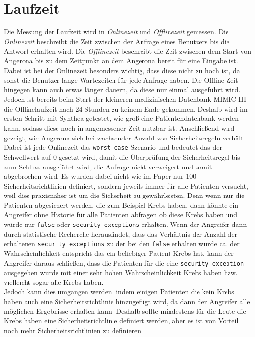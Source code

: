 \documentclass[german,version-2020-11]{uzl-thesis}
\begin{document}
\section{Laufzeit}
Die Messung der Laufzeit wird in \textit{Onlinezeit} und \textit{Offlinezeit} gemessen. Die \textit{Onlinezeit} beschreibt die Zeit zwischen der Anfrage eines Benutzers bis die Antwort erhalten wird. Die \textit{Offlinezeit}  beschreibt die Zeit zwischen dem Start von Angerona bis zu dem Zeitpunkt an dem Angerona bereit für eine Eingabe ist. \\ 
Dabei ist bei der Onlinezeit besonders wichtig, dass diese nicht zu hoch ist, da sonst die Benutzer lange Wartezeiten  für jede Anfrage haben. Die Offline Zeit hingegen kann auch etwas länger dauern, da diese nur einmal ausgeführt wird. \\
Jedoch ist bereits beim Start der kleineren medizinischen Datenbank MIMIC III die Offlinelaufzeit nach 24 Stunden zu keinem Ende gekommen. Deshalb wird im ersten Schritt mit Synthea getestet, wie groß eine Patientendatenbank werden kann, sodass diese noch in angemessener Zeit nutzbar ist.   
Anschließend wird gezeigt, wie Angerona sich bei wachsender Anzahl von Sicherheitsregeln verhält.\\ 
Dabei ist jede Onlinezeit das \texttt{worst-case} Szenario und bedeutet das der Schwellwert auf 0 gesetzt wird, damit die Überprüfung der Sicherheitsregel bis zum Schluss ausgeführt wird, die Anfrage nicht verweigert und somit abgebrochen wird. Es wurden dabei nicht wie im Paper nur 100 Sicherheitsrichtlinien definiert, sondern jeweils immer für alle Patienten versucht, weil dies praxisnäher ist um die Sicherheit zu gewährleisten. Denn wenn nur die Patienten abgesichert werden, die zum Beispiel Krebs haben, dann könnte ein Angreifer ohne Historie für alle Patienten abfragen ob diese Krebs haben und würde nur \texttt{false} oder \texttt{security exceptions} erhalten. Wenn der Angreifer dann durch statistische Recherche herausfindet, dass das Verhältnis der Anzahl der erhaltenen \texttt{security exceptions} zu der bei den \texttt{false} erhalten wurde ca. der Wahrscheinlichkeit entspricht das ein beliebiger Patient Krebs hat, kann der Angreifer daraus schließen, dass die Patienten für die eine \texttt{security exception} ausgegeben wurde mit einer sehr hohen Wahrscheinlichkeit Krebs haben bzw. vielleicht sogar alle Krebs haben. \\ 
Jedoch kann dies umgangen werden, indem einigen Patienten die kein Krebs haben auch eine Sicherheitsrichtlinie hinzugefügt wird, da dann der Angreifer alle möglichen Ergebnisse erhalten kann. Deshalb sollte mindestens für die Leute die Krebs haben eine Sicherheitsrichtlinie definiert werden, aber es ist von Vorteil noch mehr Sicherheitsrichtlinien zu definieren.
\end{document}

